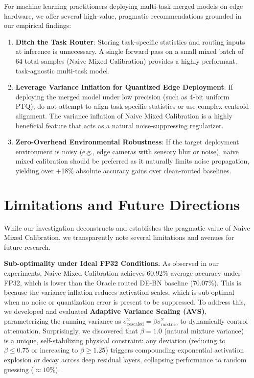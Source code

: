 \documentclass{article}
\theoremstyle{plain}
\theoremstyle{definition}
\theoremstyle{remark}
\begin{document}
For machine learning practitioners deploying multi-task merged models on edge hardware, we offer several high-value, pragmatic recommendations grounded in our empirical findings:
\begin{enumerate}
    \item \textbf{Ditch the Task Router}: Storing task-specific statistics and routing inputs at inference is unnecessary. A single forward pass on a small mixed batch of 64 total samples (Naive Mixed Calibration) provides a highly performant, task-agnostic multi-task model.
    \item \textbf{Leverage Variance Inflation for Quantized Edge Deployment}: If deploying the merged model under low precision (such as 4-bit uniform PTQ), do not attempt to align task-specific statistics or use complex centroid alignment. The variance inflation of Naive Mixed Calibration is a highly beneficial feature that acts as a natural noise-suppressing regularizer.
    \item \textbf{Zero-Overhead Environmental Robustness}: If the target deployment environment is noisy (e.g., edge cameras with sensory blur or noise), naive mixed calibration should be preferred as it naturally limits noise propagation, yielding over +18\% absolute accuracy gains over clean-routed baselines.
\end{enumerate}

\vspace{-8pt}
\section{Limitations and Future Directions}
\label{sec:limitations}

While our investigation deconstructs and establishes the pragmatic value of Naive Mixed Calibration, we transparently note several limitations and avenues for future research.

\textbf{Sub-optimality under Ideal FP32 Conditions.} As observed in our experiments, Naive Mixed Calibration achieves 60.92\% average accuracy under FP32, which is lower than the Oracle routed DE-BN baseline (70.07\%). This is because the variance inflation reduces activation scales, which is sub-optimal when no noise or quantization error is present to be suppressed. To address this, we developed and evaluated \textbf{Adaptive Variance Scaling (AVS)}, parameterizing the running variance as $\sigma^2_{\text{rescaled}} = \beta \sigma^2_{\text{mixture}}$ to dynamically control attenuation. Surprisingly, we discovered that $\beta = 1.0$ (natural mixture variance) is a unique, self-stabilizing physical constraint: any deviation (reducing to $\beta \le 0.75$ or increasing to $\beta \ge 1.25$) triggers compounding exponential activation explosion or decay across deep residual layers, collapsing performance to random guessing ($\approx 10\%$).
\end{document}
